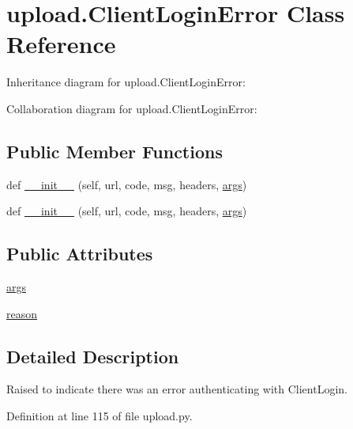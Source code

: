 \hypertarget{classupload_1_1_client_login_error}{}\section{upload.\+Client\+Login\+Error Class Reference}
\label{classupload_1_1_client_login_error}


Inheritance diagram for upload.\+Client\+Login\+Error\+:


Collaboration diagram for upload.\+Client\+Login\+Error\+:
\subsection*{Public Member Functions}
\begin{DoxyCompactItemize}
\item 
def \hyperlink{classupload_1_1_client_login_error_a1e590616c2976d881e155958cedbbe47}{\+\_\+\+\_\+init\+\_\+\+\_\+} (self, url, code, msg, headers, \hyperlink{classupload_1_1_client_login_error_ac300a0b034b2bc64cedc51e09fb6d663}{args})
\item 
def \hyperlink{classupload_1_1_client_login_error_a1e590616c2976d881e155958cedbbe47}{\+\_\+\+\_\+init\+\_\+\+\_\+} (self, url, code, msg, headers, \hyperlink{classupload_1_1_client_login_error_ac300a0b034b2bc64cedc51e09fb6d663}{args})
\end{DoxyCompactItemize}
\subsection*{Public Attributes}
\begin{DoxyCompactItemize}
\item 
\hyperlink{classupload_1_1_client_login_error_ac300a0b034b2bc64cedc51e09fb6d663}{args}
\item 
\hyperlink{classupload_1_1_client_login_error_ae0555feb182d89d1e4d7944afbfe14e5}{reason}
\end{DoxyCompactItemize}


\subsection{Detailed Description}
\begin{DoxyVerb}Raised to indicate there was an error authenticating with ClientLogin.\end{DoxyVerb}
 

Definition at line 115 of file upload.\+py.




